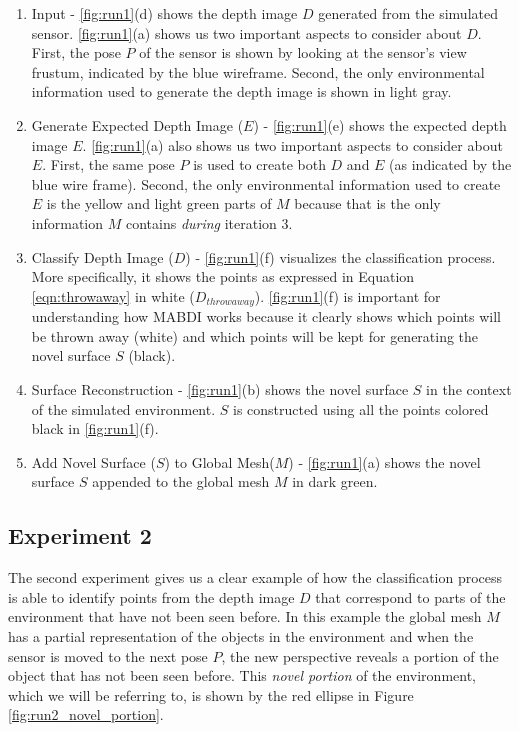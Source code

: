 \begin{sloppypar} %
\begin{enumerate}
  \item Input - \ref{fig:run1}(d) shows the depth image $D$ generated from the
  simulated sensor. \ref{fig:run1}(a) shows us two important aspects to consider
  about $D$. First, the pose $P$ of the sensor is shown by looking at the
  sensor's view frustum, indicated by the blue wireframe. Second, the only
  environmental information used to generate the depth image is shown in light
  gray.
  \item Generate Expected Depth Image ($E$) - \ref{fig:run1}(e) shows the
  expected depth image $E$. \ref{fig:run1}(a) also shows us two important
  aspects to consider about $E$. First, the same pose $P$ is used to create both
  $D$ and $E$ (as indicated by the blue wire frame). Second, the only
  environmental information used to create $E$ is the yellow and light green
  parts of $M$ because that is the only information $M$ contains \emph{during}
  iteration 3.
  \item Classify Depth Image ($D$) - \ref{fig:run1}(f) visualizes the
  classification process. More specifically, it shows the points as expressed in
  Equation \ref{eqn:throwaway} in white ($D_{throwaway}$). \ref{fig:run1}(f) is
  important for understanding how MABDI works because it clearly shows which
  points will be thrown away (white) and which points will be kept for
  generating the novel surface $S$ (black).
  \item Surface Reconstruction - \ref{fig:run1}(b) shows the novel surface $S$
  in the context of the simulated environment. $S$ is constructed using all the
  points colored black in \ref{fig:run1}(f).
  \item Add Novel Surface ($S$) to Global Mesh($M$) - \ref{fig:run1}(a) shows
  the novel surface $S$ appended to the global mesh $M$ in dark green.
\end{enumerate}
\end{sloppypar}

\subsection{Experiment 2}

The second experiment gives us a clear example of how the classification process
is able to identify points from the depth image $D$ that correspond to parts of
the environment that have not been seen before. In this example the global mesh
$M$ has a partial representation of the objects in the environment and when the
sensor is moved to the next pose $P$, the new perspective reveals a portion of
the object that has not been seen before. This \emph{novel portion} of the
environment, which we will be referring to, is shown by the red ellipse in Figure
\ref{fig:run2_novel_portion}.

